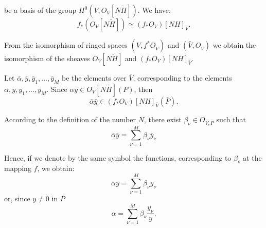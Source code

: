 
be a basis of the group $H^0(V,O_V[N\widetilde H])$. We have:
\[
f_*(O_V[N\widetilde H])\simeq(f_*O_V)[NH]_{\bar V}.
\]

From the isomorphism of ringed spaces $(V,f^*O_{\bar V})$ and $(\bar V,O_{\bar V})$ we obtain the isomorphism of the sheaves $O_V[N\widetilde H]$ and $(f_*O_V)[NH]_{\bar V}$.

Let $\bar\alpha,\bar y,\bar y_1,\ldots,\bar y_M$ be the elements over $\bar V$, corresponding to the elements $\alpha,y,y_1,\ldots,y_M$. Since $\alpha y\in O_V[N\widetilde H](P)$, then
\[
\bar\alpha\bar y\in(f_*O_V)[NH]_{\bar V}(\bar P).
\]

According to the definition of the number $N$, there exist $\beta_\nu\in O_{\bar V,\bar P}$ such that
\[
\bar\alpha\bar y=\sum_{\nu=1}^M\beta_\nu\bar y_\nu
\]

Hence, if we denote by the same symbol the functions, corresponding to $\beta_\nu$ at the mapping $f$, we obtain:
\[
\alpha y=\sum_{\nu=1}^M\beta_\nu y_\nu
\]
or, since $y\ne0$ in $P$
\[
\alpha=\sum_{\nu=1}^M\beta_\nu\frac{y_\nu}{y}.\tag{24}
\]

